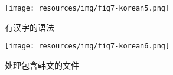 \begin{figure}[!ht]
\begin{center}
\texttt{[image: resources/img/fig7-korean5.png]}
\caption{有汉字的语法\label{fig7-korean5}}
\end{center}
\end{figure}

\begin{figure}[!ht]
\begin{center}
\texttt{[image: resources/img/fig7-korean6.png]}
\caption{处理包含韩文的文件\label{fig7-korean6}}
\end{center}
\end{figure}
